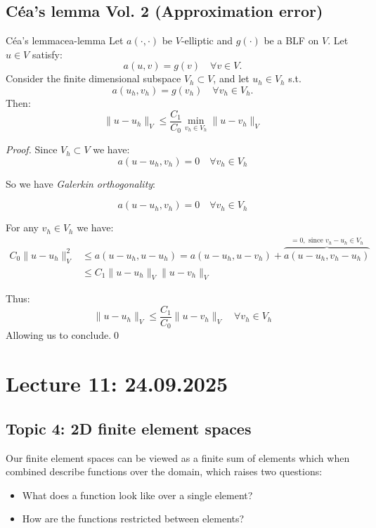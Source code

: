 \subsection{Céa's lemma Vol. 2 (Approximation error)}
\begin{theorem}{Céa's lemma}{cea-lemma}
    Let $a(\cdot, \cdot)$ be $V$-elliptic and $g(\cdot)$ be a BLF on $V$. Let $u \in V$ satisfy:
    \[
        a(u, v) = g(v) \quad \forall v \in V.
    \]
    Consider the finite dimensional subspace $V_h \subset V$, and let $u_h \in V_h$ s.t.
    \[
        a(u_h, v_h) = g(v_h) \quad \forall v_h \in V_h.
    \]
    Then:
    \[
        \|u - u_h\|_V \leq \frac{C_1}{C_0} \min_{v_h \in V_h} \|u - v_h\|_V
    \]
\end{theorem}
\begin{proof}
    Since $V_h \subset V$ we have:
    \[
        a(u - u_h, v_h) = 0 \quad \forall v_h \in V_h
    \]

    So we have \emph{Galerkin orthogonality}:

    \[
        a(u - u_h,v_h) = 0 \quad \forall v_h \in V_h
    \]

    For any $v_h \in V_h$ we have:
    \begin{align*}
        C_0 \|u - u_h\|_V^2 & \leq a(u - u_h, u - u_h) \tag{coercivity} = a(u - u_h, u - v_h) + \overbrace{a(u - u_h, v_h - u_h)}^{= 0, \text{ since } v_h - u_h \in V_h} \\
                            & \leq C_1 \|u - u_h\|_V \|u - v_h\|_V \tag{continuity}
    \end{align*}

    Thus:
    \[
        \|u - u_h\|_V \leq \frac{C_1}{C_0} \|u - v_h\|_V \quad \forall v_h \in V_h
    \]
    Allowing us to conclude.\qed
\end{proof}

\section{Lecture 11: 24.09.2025}

\subsection{Topic 4: 2D finite element spaces}

Our finite element spaces can be viewed as a finite sum of elements which when combined describe functions over the domain, which raises two questions:
\begin{itemize}
    \item What does a function look like over a single element?
    \item How are the functions restricted between elements?
\end{itemize}


